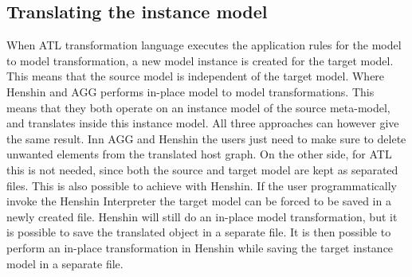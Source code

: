 \subsection{Translating the instance model}

When ATL transformation language executes the application rules for the model to
model transformation, a new model instance is created for the target model. This
means that the source model is independent of the target model. Where Henshin
and AGG performs in-place model to model transformations. This means that they
both operate on an instance model of the source meta-model, and translates
inside this instance model. All three approaches can however give the same
result. Inn AGG and Henshin the users just need to make sure to delete unwanted
elements from the translated host graph. On the other side, for ATL this is not
needed, since both the source and target model are kept as separated files. This
is also possible to achieve with Henshin. If the user programmatically invoke
the Henshin Interpreter the target model can be forced to be saved in a newly
created file. Henshin will still do an in-place model transformation, but it is
possible to save the translated object in a separate file. It is then possible
to perform an in-place transformation in Henshin while saving the target
instance model in a separate file. 


